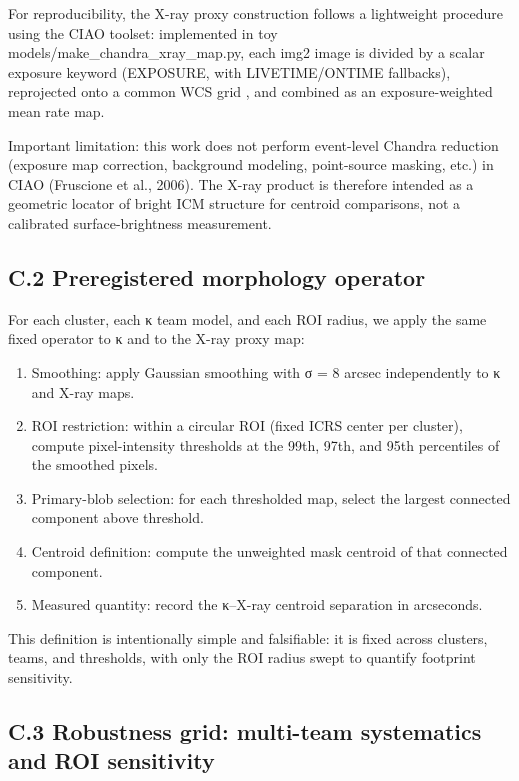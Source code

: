 \documentclass[11pt]{article}
\begin{document}
For reproducibility, the X-ray proxy construction follows a lightweight procedure using the \citep{Fruscione2006CIAO} CIAO toolset: implemented in toy models/make\_chandra\_xray\_map.py, each img2 image is divided by a scalar exposure keyword (EXPOSURE, with LIVETIME/ONTIME fallbacks), reprojected onto a common WCS grid \citep{MAST2019HFF}, and combined as an exposure-weighted mean rate map.

Important limitation: this work does not perform event-level Chandra reduction (exposure map correction, background modeling, point-source masking, etc.) in CIAO (Fruscione et al., 2006). The X-ray product is therefore intended as a geometric locator of bright ICM structure for centroid comparisons, not a calibrated surface-brightness measurement.

\subsection{C.2 Preregistered morphology operator}\label{c.2-preregistered-morphology-operator}

For each cluster, each κ team model, and each ROI radius, we apply the same fixed operator to κ and to the X-ray proxy map:

\begin{enumerate}
\def\labelenumi{\arabic{enumi})}
\item
  Smoothing: apply Gaussian smoothing with σ = 8 arcsec independently to κ and X-ray maps.
\item
  ROI restriction: within a circular ROI (fixed ICRS center per cluster), compute pixel-intensity thresholds at the 99th, 97th, and 95th percentiles of the smoothed pixels.
\item
  Primary-blob selection: for each thresholded map, select the largest connected component above threshold.
\item
  Centroid definition: compute the unweighted mask centroid of that connected component.
\item
  Measured quantity: record the κ--X-ray centroid separation in arcseconds.
\end{enumerate}

\citep{MAST2019HFF, Weisskopf2002Chandra, Fruscione2006CIAO} This definition is intentionally simple and falsifiable: it is fixed across clusters, teams, and thresholds, with only the ROI radius swept to quantify footprint sensitivity.

\subsection{C.3 Robustness grid: multi-team systematics and ROI sensitivity}\label{c.3-robustness-grid-multi-team-systematics-and-roi-sensitivity}
\end{document}
